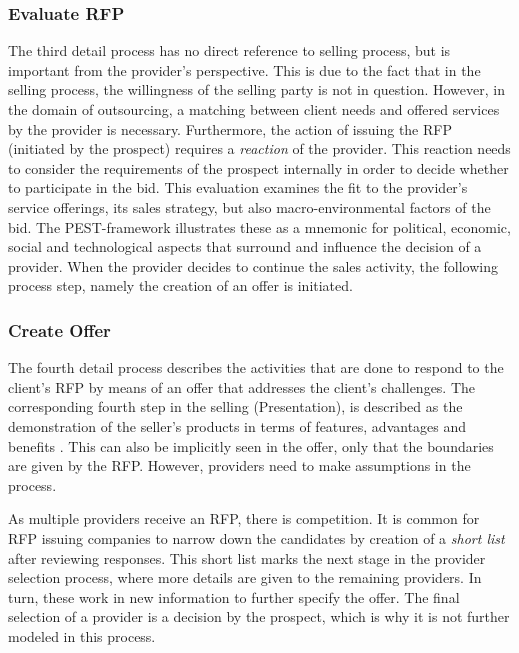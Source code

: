 	\subsubsection{Evaluate \acrshort{RFP}}
	
	The third detail process has no direct reference to selling process, but is important  from the provider's perspective.  This is due to the fact that in the selling process, the willingness of the selling party is not in question. However, in the domain of outsourcing, a matching between client needs and offered services by the provider is necessary. Furthermore, the action of issuing the \acrshort{RFP} (initiated by the prospect) requires a \textit{reaction} of the provider. This reaction needs to consider the requirements of the prospect internally in order to decide whether to participate in the bid. This evaluation examines the fit to the provider's service offerings, its sales strategy, but also macro-environmental factors of the bid. The PEST-framework \citep{0314852336} illustrates these as a mnemonic for political, economic, social and technological aspects that surround and influence the decision of a provider. 
	When the provider decides to continue the sales activity, the following process step, namely the creation of an offer is initiated. 
	
	\subsubsection{Create Offer}
	The fourth detail process describes the activities that are done to respond to the client's \acrshort{RFP} by means of an offer that addresses the client's challenges. The corresponding fourth step in the selling (Presentation), is described as the demonstration of the seller's products in terms of features, advantages and benefits \citep{Moncrief_2005}. This can also be implicitly seen in the offer, only that the boundaries are given by the \acrshort{RFP}. However, providers need to make assumptions in the process. 
	
	As multiple providers receive an \acrshort{RFP}, there is competition. It is common for \acrshort{RFP} issuing companies to narrow down the candidates by creation of a \textit{short list} after reviewing responses. This short list marks the next stage in the provider selection process, where more details are given to the remaining providers. In turn, these work in new information to further specify the offer. The final selection of a provider is a decision by the prospect, which is why it is not further modeled in this process. 
	
